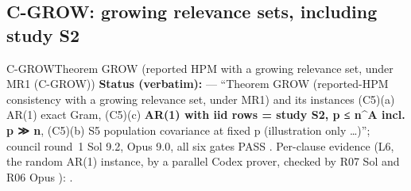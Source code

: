 \subsection{C-GROW: growing relevance sets, including study S2}\label{sec:loop:grow}
\begin{card}{C-GROW}{Theorem GROW (reported HPM with a growing relevance set, under MR1 (C-GROW))}
\textbf{Status (verbatim):}  — ``Theorem GROW (reported-HPM consistency with a growing relevance set, under MR1) and its instances (C5)(a) AR(1) exact Gram, (C5)(c) \textbf{AR(1) with iid rows = study S2, p ≤ n\textasciicircum{}A incl. p ≫ n}, (C5)(b) S5 population covariance at fixed p (illustration only \ldots)''; council round~1 Sol 9.2, Opus 9.0, all six gates PASS . Per-clause evidence (L6, the random AR(1) instance, by a parallel Codex prover, checked by R07 Sol  and R06 Opus ): .


\end{card}
